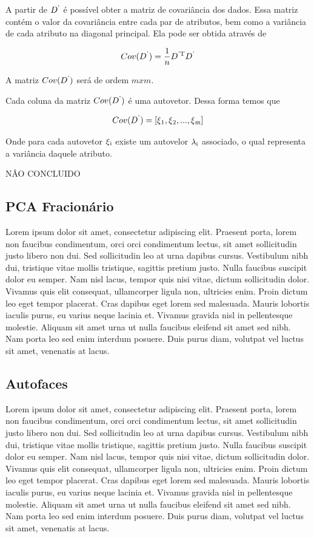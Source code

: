 \documentclass[12pt]{article}
\begin{document}
A partir de $D\textsuperscript{'}$ é possível obter a matriz de covariância dos dados. Essa matriz contém o valor da covariância entre cada par de atributos, bem como a variância de cada atributo na diagonal principal. Ela pode ser obtida através de

$$
Cov(D\textsuperscript{'}) = \frac{1}{n} D\textsuperscript{'T} D\textsuperscript{'}
$$

A matriz $Cov(D\textsuperscript{'})$ será de ordem $m x m$.

Cada coluna da matriz $Cov(D\textsuperscript{'})$ é uma autovetor. Dessa forma temos que

$$
Cov(D\textsuperscript{'}) = [\xi\textsubscript{1}, \xi\textsubscript{2}, ..., \xi\textsubscript{m}]
$$

Onde para cada autovetor $\xi\textsubscript{i}$ existe um autovelor $\lambda\textsubscript{i}$ associado, o qual representa a variância daquele atributo.

NÂO CONCLUIDO

\subsection{PCA Fracionário}

Lorem ipsum dolor sit amet, consectetur adipiscing elit. Praesent porta, lorem non faucibus condimentum, orci orci condimentum lectus, sit amet sollicitudin justo libero non dui. Sed sollicitudin leo at urna dapibus cursus. Vestibulum nibh dui, tristique vitae mollis tristique, sagittis pretium justo. Nulla faucibus suscipit dolor eu semper. Nam nisl lacus, tempor quis nisi vitae, dictum sollicitudin dolor. Vivamus quis elit consequat, ullamcorper ligula non, ultricies enim. Proin dictum leo eget tempor placerat. Cras dapibus eget lorem sed malesuada. Mauris lobortis iaculis purus, eu varius neque lacinia et. Vivamus gravida nisl in pellentesque molestie. Aliquam sit amet urna ut nulla faucibus eleifend sit amet sed nibh. Nam porta leo sed enim interdum posuere. Duis purus diam, volutpat vel luctus sit amet, venenatis at lacus. 

\subsection{Autofaces}

Lorem ipsum dolor sit amet, consectetur adipiscing elit. Praesent porta, lorem non faucibus condimentum, orci orci condimentum lectus, sit amet sollicitudin justo libero non dui. Sed sollicitudin leo at urna dapibus cursus. Vestibulum nibh dui, tristique vitae mollis tristique, sagittis pretium justo. Nulla faucibus suscipit dolor eu semper. Nam nisl lacus, tempor quis nisi vitae, dictum sollicitudin dolor. Vivamus quis elit consequat, ullamcorper ligula non, ultricies enim. Proin dictum leo eget tempor placerat. Cras dapibus eget lorem sed malesuada. Mauris lobortis iaculis purus, eu varius neque lacinia et. Vivamus gravida nisl in pellentesque molestie. Aliquam sit amet urna ut nulla faucibus eleifend sit amet sed nibh. Nam porta leo sed enim interdum posuere. Duis purus diam, volutpat vel luctus sit amet, venenatis at lacus. 
\end{document}

